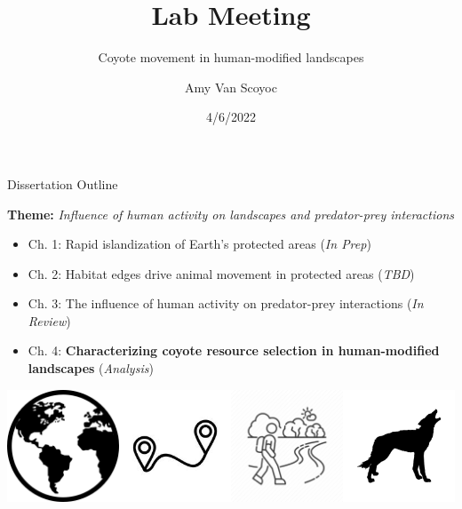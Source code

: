 \documentclass[
  ignorenonframetext,
]{beamer}
\title{Lab Meeting}
\subtitle{Coyote movement in human-modified landscapes}
\author{Amy Van Scoyoc}
\date{4/6/2022}
\providecommand{\tightlist}{%
  \setlength{\itemsep}{0pt}\setlength{\parskip}{0pt}}
\begin{document}
\frame{\titlepage}

\begin{frame}{Dissertation Outline}
\protect\hypertarget{dissertation-outline}{}

\textbf{Theme:} \emph{Influence of human activity on landscapes and
predator-prey interactions}

\begin{itemize}
\tightlist
\item
  Ch. 1: Rapid islandization of Earth's protected areas (\emph{In Prep})
\item
  Ch. 2: Habitat edges drive animal movement in protected areas
  (\emph{TBD})
\item
  Ch. 3: The influence of human activity on predator-prey interactions
  (\emph{In Review})
\item
  Ch. 4: \textbf{Characterizing coyote resource selection in
  human-modified landscapes} (\emph{Analysis})
\end{itemize}

\includegraphics[width=0.25\textwidth,height=\textheight]{images/earth.png}\includegraphics[width=0.25\textwidth,height=\textheight]{images/pathway.png}\includegraphics[width=0.25\textwidth,height=\textheight]{images/human.png}\includegraphics[width=0.25\textwidth,height=\textheight]{images/coyote.png}

\end{frame}
\end{document}
